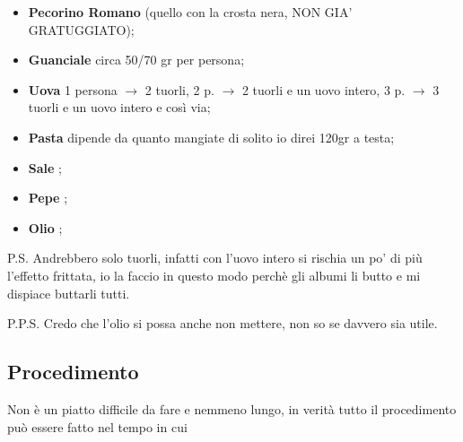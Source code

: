 \begin{itemize}
\item { \bf Pecorino Romano} (quello con la crosta nera, NON GIA' GRATUGGIATO);
\item {\bf Guanciale} circa 50/70 gr per persona;
\item {\bf Uova} 1 persona $\to$ 2 tuorli, 2 p. $\to$ 2 tuorli e un uovo intero, 3 p. $\to$ 3 tuorli e un uovo intero e così via;
\item {\bf Pasta } dipende da quanto mangiate di solito io direi 120gr a testa; 
\item {\bf Sale };
\item {\bf Pepe }; 
\item {\bf Olio };
\end{itemize}

P.S. Andrebbero solo tuorli, infatti con l'uovo intero si rischia un po' di più l'effetto frittata, io la faccio in questo modo perchè gli albumi li butto e mi dispiace buttarli tutti.

P.P.S. Credo che l'olio si possa anche non mettere, non so se davvero sia utile.

\subsection{Procedimento}
Non è un piatto difficile da fare e nemmeno lungo, in verità tutto il procedimento può essere fatto nel tempo in cui 


